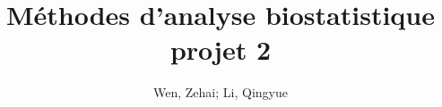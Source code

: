 \documentclass[12pt]{report}
\title{Méthodes d'analyse biostatistique projet 2}
\author{Wen, Zehai; Li, Qingyue }
\date{\DTMnow}
\theoremstyle{plain}
\theoremstyle{definition}
\begin{document}
\begin{CJK*}{UTF8}{gbsn}
\maketitle

\setcounter{tocdepth}{0}










\end{CJK*}
\end{document}
